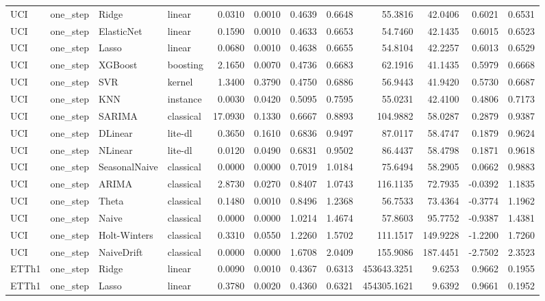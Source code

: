 \begin{tabular}{llllrrrrrrrr}
UCI & one_step & Ridge & linear & 0.0310 & 0.0010 & 0.4639 & 0.6648 & 55.3816 & 42.0406 & 0.6021 & 0.6531 \\
UCI & one_step & ElasticNet & linear & 0.1590 & 0.0010 & 0.4633 & 0.6653 & 54.7460 & 42.1435 & 0.6015 & 0.6523 \\
UCI & one_step & Lasso & linear & 0.0680 & 0.0010 & 0.4638 & 0.6655 & 54.8104 & 42.2257 & 0.6013 & 0.6529 \\
UCI & one_step & XGBoost & boosting & 2.1650 & 0.0070 & 0.4736 & 0.6683 & 62.1916 & 41.1435 & 0.5979 & 0.6668 \\
UCI & one_step & SVR & kernel & 1.3400 & 0.3790 & 0.4750 & 0.6886 & 56.9443 & 41.9420 & 0.5730 & 0.6687 \\
UCI & one_step & KNN & instance & 0.0030 & 0.0420 & 0.5095 & 0.7595 & 55.0231 & 42.4100 & 0.4806 & 0.7173 \\
UCI & one_step & SARIMA & classical & 17.0930 & 0.1330 & 0.6667 & 0.8893 & 104.9882 & 58.0287 & 0.2879 & 0.9387 \\
UCI & one_step & DLinear & lite-dl & 0.3650 & 0.1610 & 0.6836 & 0.9497 & 87.0117 & 58.4747 & 0.1879 & 0.9624 \\
UCI & one_step & NLinear & lite-dl & 0.0120 & 0.0490 & 0.6831 & 0.9502 & 86.4437 & 58.4798 & 0.1871 & 0.9618 \\
UCI & one_step & SeasonalNaive & classical & 0.0000 & 0.0000 & 0.7019 & 1.0184 & 75.6494 & 58.2905 & 0.0662 & 0.9883 \\
UCI & one_step & ARIMA & classical & 2.8730 & 0.0270 & 0.8407 & 1.0743 & 116.1135 & 72.7935 & -0.0392 & 1.1835 \\
UCI & one_step & Theta & classical & 0.1480 & 0.0010 & 0.8496 & 1.2368 & 56.7533 & 73.4364 & -0.3774 & 1.1962 \\
UCI & one_step & Naive & classical & 0.0000 & 0.0000 & 1.0214 & 1.4674 & 57.8603 & 95.7752 & -0.9387 & 1.4381 \\
UCI & one_step & Holt-Winters & classical & 0.3310 & 0.0550 & 1.2260 & 1.5702 & 111.1517 & 149.9228 & -1.2200 & 1.7260 \\
UCI & one_step & NaiveDrift & classical & 0.0000 & 0.0000 & 1.6708 & 2.0409 & 155.9086 & 187.4451 & -2.7502 & 2.3523 \\
ETTh1 & one_step & Ridge & linear & 0.0090 & 0.0010 & 0.4367 & 0.6313 & 453643.3251 & 9.6253 & 0.9662 & 0.1955 \\
ETTh1 & one_step & Lasso & linear & 0.3780 & 0.0020 & 0.4360 & 0.6321 & 454305.1621 & 9.6392 & 0.9661 & 0.1952 \\

\end{tabular}
